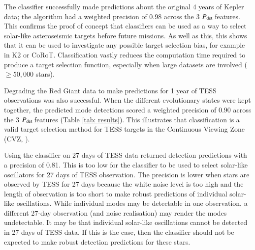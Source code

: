 \documentclass[a4paper,fleqn,usenatbib,useAMS]{mnras}
\newcommand{\kep}{\ensuremath{Kepler}\:}
\newcommand{\pdet}{\ensuremath{P_{\rm det}\:}}
\begin{document}
The classifier successfully made predictions about the original 4 years of Kepler data; the algorithm had a weighted precision of 0.98 across the 3 \pdet features. This confirms the proof of concept that classifiers can be used as a way to select solar-like asteroseismic targets before future missions. As well as this, this shows that it can be used to investigate any possible target selection bias, for example in K2 or CoRoT. Classification vastly reduces the computation time required to produce a target selection function, especially when large datasets are involved ($\geq50,000$ stars).  

Degrading the Red Giant data to make predictions for 1 year of TESS observations was also successful. When the different evolutionary states were kept together, the predicted mode detections scored a weighted precision of 0.90 across the 3 \pdet features (Table \ref{tab: results}). This illustrates that classification is a valid target selection method for TESS targets in the Continuous Viewing Zone (CVZ, \citep{ricker_transiting_2014}).

Using the classifier on 27 days of TESS data returned detection predictions with a precision of 0.81. This is too low for the classifier to be used to select solar-like oscillators for 27 days of TESS observation. The precision is lower when stars are observed by TESS for 27 days because the white noise level is too high and the length of observation is too short to make robust predictions of individual solar-like oscillations. While individual modes may be detectable in one observation, a different 27-day observation (and noise realisation) may render the modes undetectable. It may be that individual solar-like oscillations cannot be detected in 27 days of TESS data. If this is the case, then the classifier should not be expected to make robust detection predictions for these stars.









\bsp
\label{lastpage}
\end{document}
